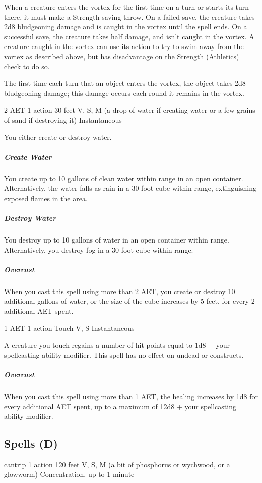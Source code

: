 When a creature enters the vortex for the first time on a turn or starts its turn there, it must make a Strength saving throw. On a failed save, the creature takes 2d8 bludgeoning damage and is caught in the vortex until the spell ends. On a successful save, the creature takes half damage, and isn't caught in the vortex. A creature caught in the vortex can use its action to try to swim away from the vortex as described above, but has disadvantage on the Strength (Athletics) check to do so.

The first time each turn that an object enters the vortex, the object takes 2d8 bludgeoning damage; this damage occurs each round it remains in the vortex.


{2 AET}
{1 action}
{30 feet}
{V, S, M (a drop of water if creating water or a few grains of sand if destroying it)}
{Instantaneous}

You either create or destroy water.

\subparagraph*{Create Water} You create up to 10 gallons of clean water within range in an open container. Alternatively, the water falls as rain in a 30-foot cube within range, extinguishing exposed flames in the area.

\subparagraph*{Destroy Water} You destroy up to 10 gallons of water in an open container within range. Alternatively, you destroy fog in a 30-foot cube within range.

\subparagraph*{Overcast} When you cast this spell using more than 2 AET, you create or destroy 10 additional gallons of water, or the size of the cube increases by 5 feet, for every 2 additional AET spent.


{1 AET}
{1 action}
{Touch}
{V, S}
{Instantaneous}

A creature you touch regains a number of hit points equal to 1d8 + your spellcasting ability modifier. This spell has no effect on undead or constructs.

\subparagraph*{Overcast} When you cast this spell using more than 1 AET, the healing increases by 1d8 for every additional AET spent, up to a maximum of 12d8 + your spellcasting ability modifier.

\subsection{Spells (D)}


{cantrip}
{1 action}
{120 feet}
{V, S, M (a bit of phosphorus or wychwood, or a glowworm)}
{Concentration, up to 1 minute}

